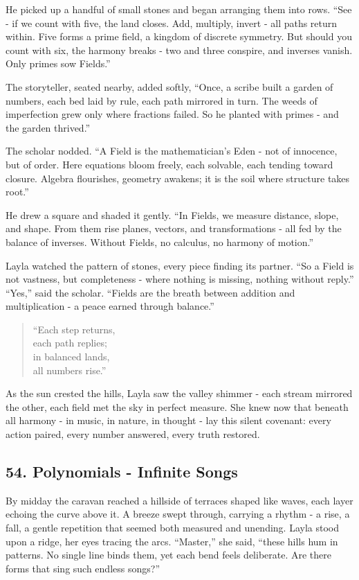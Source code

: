 \documentclass[
  letterpaper,
  DIV=11,
  numbers=noendperiod]{scrreprt}
\begin{document}
He picked up a handful of small stones and began arranging them into
rows. ``See - if we count with five, the land closes. Add, multiply,
invert - all paths return within. Five forms a prime field, a kingdom of
discrete symmetry. But should you count with six, the harmony breaks -
two and three conspire, and inverses vanish. Only primes sow Fields.''

The storyteller, seated nearby, added softly, ``Once, a scribe built a
garden of numbers, each bed laid by rule, each path mirrored in turn.
The weeds of imperfection grew only where fractions failed. So he
planted with primes - and the garden thrived.''

The scholar nodded. ``A Field is the mathematician's Eden - not of
innocence, but of order. Here equations bloom freely, each solvable,
each tending toward closure. Algebra flourishes, geometry awakens; it is
the soil where structure takes root.''

He drew a square and shaded it gently. ``In Fields, we measure distance,
slope, and shape. From them rise planes, vectors, and transformations -
all fed by the balance of inverses. Without Fields, no calculus, no
harmony of motion.''

Layla watched the pattern of stones, every piece finding its partner.
``So a Field is not vastness, but completeness - where nothing is
missing, nothing without reply.'' ``Yes,'' said the scholar. ``Fields
are the breath between addition and multiplication - a peace earned
through balance.''

\begin{quote}
``Each step returns,\\
each path replies;\\
in balanced lands,\\
all numbers rise.''
\end{quote}

As the sun crested the hills, Layla saw the valley shimmer - each stream
mirrored the other, each field met the sky in perfect measure. She knew
now that beneath all harmony - in music, in nature, in thought - lay
this silent covenant: every action paired, every number answered, every
truth restored.

\subsection{54. Polynomials - Infinite
Songs}\label{polynomials---infinite-songs}

By midday the caravan reached a hillside of terraces shaped like waves,
each layer echoing the curve above it. A breeze swept through, carrying
a rhythm - a rise, a fall, a gentle repetition that seemed both measured
and unending. Layla stood upon a ridge, her eyes tracing the arcs.
``Master,'' she said, ``these hills hum in patterns. No single line
binds them, yet each bend feels deliberate. Are there forms that sing
such endless songs?''
\end{document}
